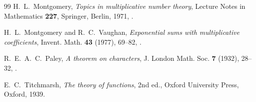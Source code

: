 \documentclass[11pt,a4paper,reqno]{amsart}
\theoremstyle{remark}
\numberwithin{equation}{section}
\begin{document}
\begin{thebibliography}{99}
H.~L.~Montgomery, \emph{Topics in multiplicative number theory}, Lecture Notes in Mathematics \textbf{227}, Springer, Berlin, 1971, .

H.~L.~Montgomery and R.~C.~Vaughan, \emph{Exponential sums with multiplicative coefficients}, Invent. Math. \textbf{43} (1977), 69--82, .

R.~E.~A.~C.~Paley, \emph{A theorem on characters}, J. London Math. Soc. \textbf{7} (1932), 28--32, .

E.~C.~Titchmarsh, \emph{The theory of functions}, 2nd ed., Oxford University Press, Oxford, 1939.

\end{thebibliography}
\end{document}
